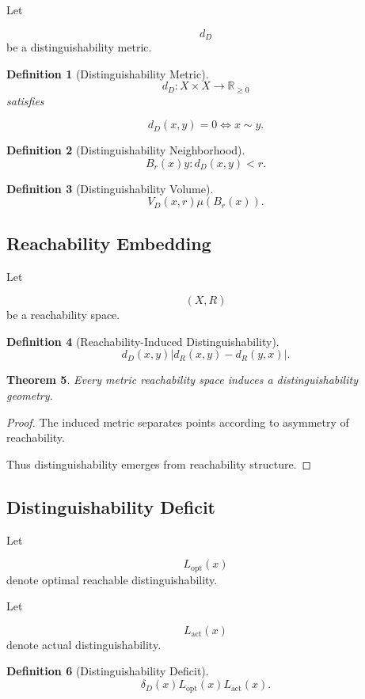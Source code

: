 \documentclass[12pt]{article}
\newtheorem{theorem}{Theorem}[section]
\newtheorem{definition}[theorem]{Definition}
\theoremstyle{remark}
\begin{document}
Let

\[
d_D
\]
be a distinguishability metric.

\begin{definition}[Distinguishability Metric]
\[
d_D:X\times X\rightarrow\mathbb R_{\ge0}
\]
satisfies

\[
d_D(x,y)=0
\iff
x\sim y.
\]
\end{definition}
\begin{definition}[Distinguishability Neighborhood]
\[
B_r(x)
{
y:
d_D(x,y)<r
}.
\]
\end{definition}

\begin{definition}[Distinguishability Volume]
\[
V_D(x,r)
\mu(B_r(x)).
\]
\end{definition}

\subsection{Reachability Embedding}

Let

\[
(X,R)
\]
be a reachability space.

\begin{definition}[Reachability-Induced Distinguishability]
\[
d_D(x,y)
|d_R(x,y)-d_R(y,x)|.
\]
\end{definition}

\begin{theorem}
Every metric reachability space induces a distinguishability geometry.
\end{theorem}

\begin{proof}
The induced metric separates points according to asymmetry of reachability.

Thus distinguishability emerges from reachability structure.
\end{proof}

\subsection{Distinguishability Deficit}

Let

\[
L_{\mathrm{opt}}(x)
\]
denote optimal reachable distinguishability.

Let

\[
L_{\mathrm{act}}(x)
\]
denote actual distinguishability.

\begin{definition}[Distinguishability Deficit]
\[
\delta_D(x)
L_{\mathrm{opt}}(x)

L_{\mathrm{act}}(x).
\]
\end{definition}
\end{document}
